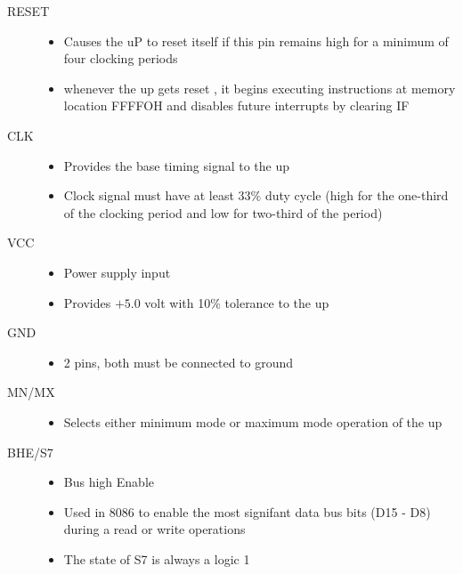\documentclass{book}
\begin{document}
\begin{description}
   \item[RESET]
   \begin{itemize}
       \item Causes the uP to reset itself if this pin remains high for a minimum of four clocking periods
      \item whenever the up gets reset , it begins executing instructions at memory location FFFFOH
      and disables future interrupts by clearing IF
   \end{itemize}

   \item[CLK]
   \begin{itemize}
       \item  Provides the base timing signal to the up
       \item Clock signal must have at least 33\% duty cycle (high for the one-third
       of the clocking period and low for two-third of the period)

  \end{itemize}

  \item[VCC]
  \begin{itemize}
      \item Power supply input
      \item Provides $+5.0$ volt with 10\% tolerance to the up

  \end{itemize}

  \item[GND]
  \begin{itemize}
      \item 2 pins, both must be connected to ground

  \end{itemize}

  \item[MN/MX]
  \begin{itemize}
      \item Selects either minimum mode or maximum mode operation of the up
  \end{itemize}


  \item[BHE/S7]
  \begin{itemize}
      \item Bus high Enable
      \item Used in 8086 to enable the most signifant data bus bits (D15 - D8) during a read or
      write operations
      \item The state of S7 is always a logic 1
  \end{itemize}


\end{description}
\end{document}
